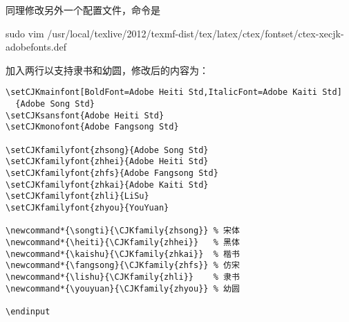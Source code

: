 同理修改另外一个配置文件，命令是
\begin{cmd}[label=修改MACTEX字体文件命令,xrightmargin=-0.8cm]
sudo vim /usr/local/texlive/2012/texmf-dist/tex/latex/ctex/fontset/ctex-xecjk-adobefonts.def
\end{cmd}
加入两行以支持隶书和幼圆，修改后的内容为：
\begin{lstlisting}[language={[LaTeX]TeX}]
\setCJKmainfont[BoldFont=Adobe Heiti Std,ItalicFont=Adobe Kaiti Std]
  {Adobe Song Std}
\setCJKsansfont{Adobe Heiti Std}
\setCJKmonofont{Adobe Fangsong Std}

\setCJKfamilyfont{zhsong}{Adobe Song Std}
\setCJKfamilyfont{zhhei}{Adobe Heiti Std}
\setCJKfamilyfont{zhfs}{Adobe Fangsong Std}
\setCJKfamilyfont{zhkai}{Adobe Kaiti Std}
\setCJKfamilyfont{zhli}{LiSu}
\setCJKfamilyfont{zhyou}{YouYuan}

\newcommand*{\songti}{\CJKfamily{zhsong}} % 宋体
\newcommand*{\heiti}{\CJKfamily{zhhei}}   % 黑体
\newcommand*{\kaishu}{\CJKfamily{zhkai}}  % 楷书
\newcommand*{\fangsong}{\CJKfamily{zhfs}} % 仿宋
\newcommand*{\lishu}{\CJKfamily{zhli}}    % 隶书
\newcommand*{\youyuan}{\CJKfamily{zhyou}} % 幼圆

\endinput
\end{lstlisting}

